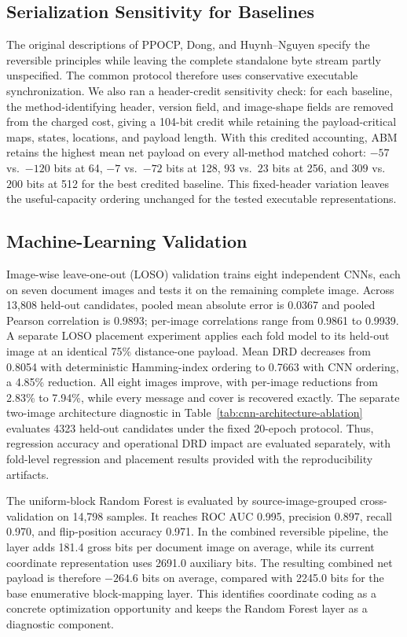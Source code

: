 \documentclass[a4paper,fleqn]{cas-dc}
\newcommand{\RevisionAddBegin}{\begingroup\color{revisionblue}}
\newcommand{\RevisionAddEnd}{\endgroup}
\begin{document}
\subsection{Serialization Sensitivity for Baselines}

The original descriptions of PPOCP, Dong, and Huynh--Nguyen specify the
reversible principles while leaving the complete standalone byte stream partly
unspecified. The common protocol therefore uses conservative executable
synchronization. We also ran a header-credit sensitivity check: for each
baseline, the method-identifying header, version field, and image-shape fields
are removed from the charged cost, giving a 104-bit credit while retaining the
payload-critical maps, states, locations, and payload length. With this
credited accounting, ABM retains the highest mean net payload on every
all-method matched cohort: $-57$ vs.\ $-120$ bits at 64, $-7$ vs.\ $-72$ bits
at 128, $93$ vs.\ $23$ bits at 256, and $309$ vs.\ $200$ bits at 512 for the
best credited baseline. This fixed-header variation leaves the useful-capacity
ordering unchanged for the tested executable representations.

\subsection{Machine-Learning Validation}

Image-wise leave-one-out (LOSO) validation trains eight independent CNNs, each
on seven document images and tests it on the remaining complete image. Across
13,808 held-out candidates, pooled mean absolute error is 0.0367 and pooled
Pearson correlation is 0.9893; per-image correlations range from 0.9861 to
0.9939. A separate LOSO placement experiment applies each fold model to its
held-out image at an identical 75\% distance-one payload. Mean DRD decreases
from 0.8054 with deterministic Hamming-index ordering to 0.7663 with CNN
ordering, a 4.85\% reduction. All eight images improve, with per-image
reductions from 2.83\% to 7.94\%, while every message and cover is recovered
\RevisionAddBegin
exactly. The separate two-image architecture diagnostic in
Table~\ref{tab:cnn-architecture-ablation} evaluates 4323 held-out candidates
under the fixed 20-epoch protocol. Thus, regression accuracy and operational
DRD impact are evaluated separately, with fold-level regression and placement
results provided with the reproducibility artifacts.
\RevisionAddEnd

The uniform-block Random Forest is evaluated by source-image-grouped
cross-validation on 14,798 samples. It reaches ROC AUC 0.995, precision 0.897,
\RevisionAddBegin
recall 0.970, and flip-position accuracy 0.971. In the combined reversible
pipeline, the layer adds 181.4 gross bits per document image on average, while
its current coordinate representation uses 2691.0 auxiliary bits. The
resulting combined net payload is therefore $-264.6$ bits on average, compared
with 2245.0 bits for the base enumerative block-mapping layer. This identifies
coordinate coding as a concrete optimization opportunity and keeps the Random
Forest layer as a diagnostic component.
\RevisionAddEnd
\end{document}
